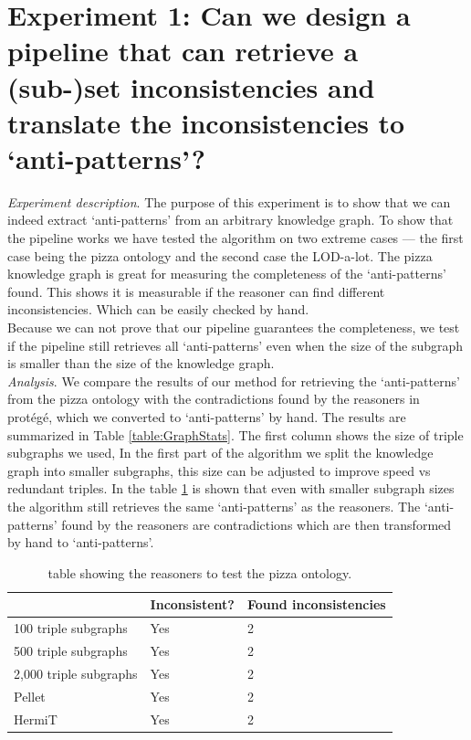 \documentclass[11pt,letterpaper ,oneside ]{book}
\begin{document}
	\section{Experiment 1:  Can we design a pipeline that can retrieve a (sub-)set inconsistencies and translate the inconsistencies to `anti-patterns'?}
	\textit{Experiment description}. The purpose of this experiment is to show that we can indeed extract `anti-patterns' from an arbitrary knowledge graph. 
	To show that the pipeline works we have tested the algorithm on two extreme cases — the first case being the pizza ontology and the second case the LOD-a-lot.
	The pizza knowledge graph is great for measuring the completeness of the `anti-patterns' found. This shows it is measurable if the reasoner can find different inconsistencies. Which can be easily checked by hand.\\
	Because we can not prove that our pipeline guarantees the completeness, we test if the pipeline still retrieves all `anti-patterns' even when the size of the subgraph is smaller than the size of the knowledge graph.\\
	\textit{Analysis}. We compare the results of our method for retrieving the `anti-patterns' from the pizza ontology with the contradictions found by the reasoners in prot\'{e}g\'{e}, which we converted to `anti-patterns' by hand.
	The results are summarized in Table \ref{table:GraphStats}. The first column shows the size of triple subgraphs we used, In the first part of the algorithm we split the knowledge graph into smaller subgraphs, this size can be adjusted to improve speed vs redundant triples. In the table \ref{table:PizzaOntology} is shown that even with smaller subgraph sizes the algorithm still retrieves the same `anti-patterns' as the reasoners. The `anti-patterns' found by the reasoners are contradictions which are then transformed by hand to `anti-patterns'. 
	
	\begin{table}[!t]
		\begin{tabular}{|l|l|l|}
			\hline
			& Inconsistent? & Found inconsistencies \\ \hline \hline
			100 triple subgraphs     & Yes           & 2 \\ \hline
			500 triple subgraphs     & Yes           & 2 \\ \hline
			2,000 triple subgraphs     & Yes           & 2\\ \hline
			Pellet                     & Yes           & 2\\ \hline
			HermiT                     & Yes           & 2\\ \hline
		\end{tabular}
		\caption{table showing the reasoners to test the pizza ontology.}
		\label{table:PizzaOntology}
	\end{table}
	
\end{document}
